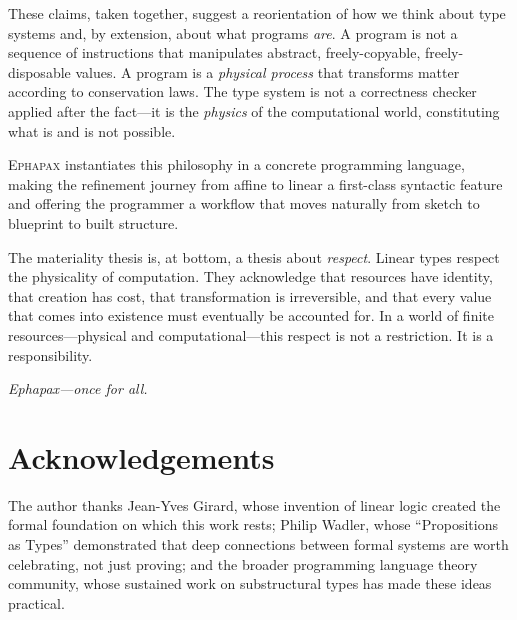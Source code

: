 \documentclass[11pt,a4paper]{article}
\newcommand{\ephapax}{\textsc{Ephapax}}
\begin{document}
These claims, taken together, suggest a reorientation of how we
think about type systems and, by extension, about what programs
\emph{are}. A program is not a sequence of instructions that
manipulates abstract, freely-copyable, freely-disposable values. A
program is a \emph{physical process} that transforms matter according
to conservation laws. The type system is not a correctness checker
applied after the fact---it is the \emph{physics} of the
computational world, constituting what is and is not possible.

\ephapax{} instantiates this philosophy in a concrete programming
language, making the refinement journey from affine to linear a
first-class syntactic feature and offering the programmer a workflow
that moves naturally from sketch to blueprint to built structure.

The materiality thesis is, at bottom, a thesis about \emph{respect}.
Linear types respect the physicality of computation. They
acknowledge that resources have identity, that creation has cost,
that transformation is irreversible, and that every value that comes
into existence must eventually be accounted for. In a world of
finite resources---physical and computational---this respect is not
a restriction. It is a responsibility.

\bigskip

\begin{center}
\emph{Ephapax---once for all.}
\end{center}


\section*{Acknowledgements}

The author thanks Jean-Yves Girard, whose invention of linear logic
created the formal foundation on which this work rests; Philip Wadler,
whose ``Propositions as Types'' demonstrated that deep connections
between formal systems are worth celebrating, not just proving; and
the broader programming language theory community, whose sustained
work on substructural types has made these ideas practical.
\end{document}
